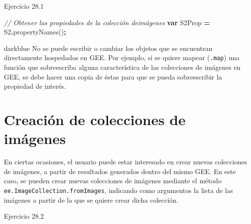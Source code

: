 \documentclass[
  12pt,
  letterpaper,
  twoside]{book}
\newenvironment{Shaded}{\begin{snugshade}}{\end{snugshade}}
\newcommand{\CommentTok}[1]{\textcolor[rgb]{0.56,0.35,0.01}{\textit{#1}}}
\newcommand{\FunctionTok}[1]{\textcolor[rgb]{0.00,0.00,0.00}{#1}}
\newcommand{\KeywordTok}[1]{\textcolor[rgb]{0.13,0.29,0.53}{\textbf{#1}}}
\newcommand{\NormalTok}[1]{#1}
\newcommand{\OperatorTok}[1]{\textcolor[rgb]{0.81,0.36,0.00}{\textbf{#1}}}
\begin{document}
Ejercicio 28.1

\begin{Shaded}
\begin{Highlighting}[]
\CommentTok{// Obtener las propiedades de la colección deimágenes}
\KeywordTok{var}\NormalTok{ S2Prop }\OperatorTok{=}\NormalTok{ S2}\OperatorTok{.}\FunctionTok{propertyNames}\NormalTok{()}\OperatorTok{;}
\end{Highlighting}
\end{Shaded}

\begin{bluebox2}

\begin{awesomeblock}{5pt}{\faLightbulb}{darkblue}
No se puede escribir o cambiar los objetos que se encuentran directamente hospedados en GEE. Por ejemplo, si se quiere mapear (\texttt{.map}) una función que sobreescriba alguna característica de las colecciones de imágenes en GEE, se debe hacer una copia de éstas para que se pueda sobreescribir la propiedad de interés.

\end{awesomeblock}

\end{bluebox2}

\hypertarget{creaciuxf3n-de-colecciones-de-imuxe1genes}{%
\section{Creación de colecciones de imágenes}\label{creaciuxf3n-de-colecciones-de-imuxe1genes}}

En ciertas ocasiones, el usuario puede estar interesado en crear nuevas colecciones de imágenes, a partir de resultados generados dentro del mismo GEE. En este caso, se pueden crear nuevas colecciones de imágenes mediante el método \texttt{ee.ImageCollection.fromImages}, indicando como argumentos la lista de las imágenes a partir de la que se quiere crear dicha colección.

Ejercicio 28.2
\end{document}
